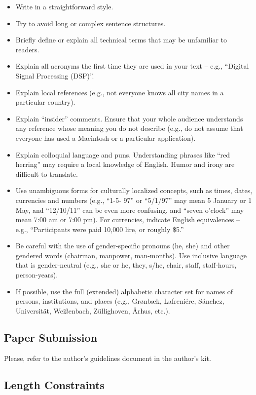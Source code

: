 \documentclass{scspaperproc}
\theoremstyle{scsthe}
\begin{document}
\begin{itemize}
\item{Write in a straightforward style.}
\item{Try to avoid long or complex sentence structures.}
\item{Briefly define or explain all technical terms that may be unfamiliar to readers.}
\item{Explain all acronyms the first time they are used in your text – e.g., “Digital Signal Processing (DSP)”.}
\item{Explain local references (e.g., not everyone knows all city names in a particular country).}
\item{Explain “insider” comments. Ensure that your whole audience understands any reference whose meaning you do not describe (e.g., do not assume that everyone has used a Macintosh or a particular application).}
\item{Explain colloquial language and puns. Understanding phrases like “red herring” may require a local knowledge of English. Humor and irony are difficult to translate.}
\item{Use unambiguous forms for culturally localized concepts, such as times, dates, currencies and numbers (e.g., “1-5- 97” or “5/1/97” may mean 5 January or 1 May, and “12/10/11” can be even more confusing, and “seven o’clock” may mean 7:00 am or 7:00 pm).  For currencies, indicate English equivalences – e.g., “Participants were paid 10,000 lire, or roughly \$5.”}
\item{Be careful with the use of gender-specific pronouns (he, she) and other gendered words (chairman, manpower, man-months). Use inclusive language that is gender-neutral (e.g., she or he, they, s/he, chair, staff, staff-hours, person-years).}
\item{If possible, use the full (extended) alphabetic character set for names of persons, institutions, and places (e.g., {Gr\o nb\ae k}, Lafreni\'ere, S\'anchez, Universit\"at, {Wei\ss enbach}, Z\"ullighoven, {\AA rhus}, etc.).}
\end{itemize}

\subsection{Paper Submission}

Please, refer to the author's guidelines document in the author's kit.

\subsection{Length Constraints}
\end{document}
